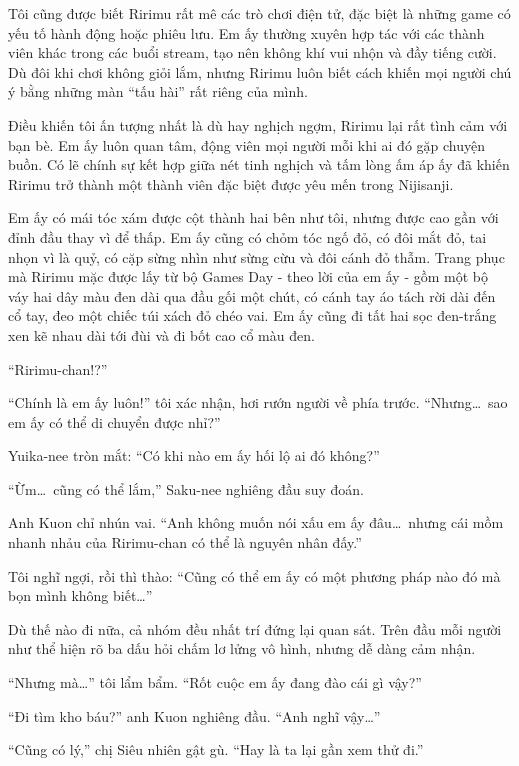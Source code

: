 \documentclass[../main.tex]{subfiles}
\begin{document}
Tôi cũng được biết Ririmu rất mê các trò chơi điện tử, đặc biệt là những game có yếu tố hành động hoặc phiêu lưu. Em ấy thường xuyên hợp tác với các thành viên khác trong các buổi stream, tạo nên không khí vui nhộn và đầy tiếng cười. Dù đôi khi chơi không giỏi lắm, nhưng Ririmu luôn biết cách khiến mọi người chú ý bằng những màn ``tấu hài'' rất riêng của mình.

Điều khiến tôi ấn tượng nhất là dù hay nghịch ngợm, Ririmu lại rất tình cảm với bạn bè. Em ấy luôn quan tâm, động viên mọi người mỗi khi ai đó gặp chuyện buồn. Có lẽ chính sự kết hợp giữa nét tinh nghịch và tấm lòng ấm áp ấy đã khiến Ririmu trở thành một thành viên đặc biệt được yêu mến trong Nijisanji.

Em ấy có mái tóc xám được cột thành hai bên như tôi, nhưng được cao gần với đỉnh đầu thay vì để thấp. Em ấy cũng có chỏm tóc ngố đỏ, có đôi mắt đỏ, tai nhọn vì là quỷ, có cặp sừng nhìn như sừng cừu và đôi cánh đỏ thẫm. Trang phục mà Ririmu mặc được lấy từ bộ Games Day - theo lời của em ấy - gồm một bộ váy hai dây màu đen dài qua đầu gối một chút, có cánh tay áo tách rời dài đến cổ tay, đeo một chiếc túi xách đỏ chéo vai. Em ấy cũng đi tất hai sọc đen-trắng xen kẽ nhau dài tới đùi và đi bốt cao cổ màu đen.

\chrint

``Ririmu-chan!?''

``Chính là em ấy luôn!'' tôi xác nhận, hơi rướn người về phía trước. ``Nhưng\dots\ sao em ấy có thể di chuyển được nhỉ?''


Yuika-nee tròn mắt: ``Có khi nào em ấy hối lộ ai đó không?''

``Ừm\dots\ cũng có thể lắm,'' Saku-nee nghiêng đầu suy đoán.

Anh Kuon chỉ nhún vai. ``Anh không muốn nói xấu em ấy đâu\dots\ nhưng cái mồm nhanh nhảu của Ririmu-chan có thể là nguyên nhân đấy.''

Tôi nghĩ ngợi, rồi thì thào: ``Cũng có thể em ấy có một phương pháp nào đó mà bọn mình không biết\dots''

Dù thế nào đi nữa, cả nhóm đều nhất trí đứng lại quan sát. Trên đầu mỗi người như thể hiện rõ ba dấu hỏi chấm lơ lửng vô hình, nhưng dễ dàng cảm nhận.

``Nhưng mà\dots'' tôi lẩm bẩm. ``Rốt cuộc em ấy đang đào cái gì vậy?''

``Đi tìm kho báu?'' anh Kuon nghiêng đầu. ``Anh nghĩ vậy\dots''

``Cũng có lý,'' chị Siêu nhiên gật gù. ``Hay là ta lại gần xem thử đi.''
\end{document}
